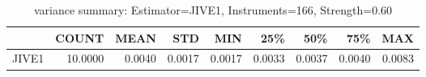 \begin{table}[ht]
\centering
\caption{variance summary: Estimator=JIVE1, Instruments=166, Strength=0.60}
\begin{tabular}{lrrrrrrrr}
\toprule
 & COUNT & MEAN & STD & MIN & 25\% & 50\% & 75\% & MAX \\
\midrule
JIVE1 & 10.0000 & 0.0040 & 0.0017 & 0.0017 & 0.0033 & 0.0037 & 0.0040 & 0.0083 \\
\bottomrule
\end{tabular}
\end{table}

